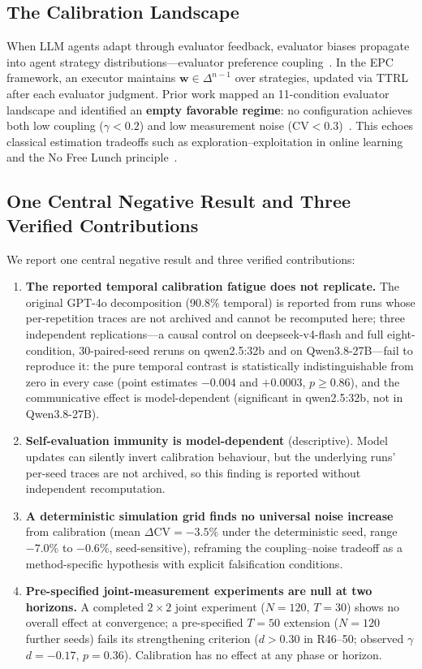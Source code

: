 \documentclass[11pt]{article}
\newcommand{\CV}{\ensuremath{\mathrm{CV}}}
\theoremstyle{definition}
\theoremstyle{remark}
\begin{document}
\subsection{The Calibration Landscape}

When LLM agents adapt through evaluator feedback, evaluator biases propagate into agent strategy distributions---evaluator preference coupling~\citep{epc2026}. In the EPC framework, an executor maintains $\mathbf{w} \in \Delta^{n-1}$ over strategies, updated via TTRL after each evaluator judgment. Prior work mapped an 11-condition evaluator landscape and identified an \textbf{empty favorable regime}: no configuration achieves both low coupling ($\gamma < 0.2$) and low measurement noise ($\CV < 0.3$)~\citep{caleffects2026}. This echoes classical estimation tradeoffs such as exploration--exploitation in online learning~\citep{bubeck2012regret} and the No Free Lunch principle~\citep{wolpert1997no}.

\subsection{One Central Negative Result and Three Verified Contributions}

We report one central negative result and three verified contributions:
\begin{enumerate}[leftmargin=*,nosep]
    \item \textbf{The reported temporal calibration fatigue does not replicate.} The original GPT-4o decomposition (90.8\% temporal) is reported from runs whose per-repetition traces are not archived and cannot be recomputed here; three independent replications---a causal control on deepseek-v4-flash and full eight-condition, 30-paired-seed reruns on qwen2.5:32b and on Qwen3.8-27B---fail to reproduce it: the pure temporal contrast is statistically indistinguishable from zero in every case (point estimates $-0.004$ and $+0.0003$, $p \geq 0.86$), and the communicative effect is model-dependent (significant in qwen2.5:32b, not in Qwen3.8-27B).
    \item \textbf{Self-evaluation immunity is model-dependent} (descriptive). Model updates can silently invert calibration behaviour, but the underlying runs' per-seed traces are not archived, so this finding is reported without independent recomputation.
    \item \textbf{A deterministic simulation grid finds no universal noise increase} from calibration (mean $\Delta\CV = -3.5\%$ under the deterministic seed, range $-7.0\%$ to $-0.6\%$, seed-sensitive), reframing the coupling--noise tradeoff as a method-specific hypothesis with explicit falsification conditions.
    \item \textbf{Pre-specified joint-measurement experiments are null at two horizons.} A completed $2 \times 2$ joint experiment ($N{=}120$, $T{=}30$) shows no overall effect at convergence; a pre-specified $T{=}50$ extension ($N{=}120$ further seeds) fails its strengthening criterion ($d > 0.30$ in R46--50; observed $\gamma$ $d{=}-0.17$, $p{=}0.36$). Calibration has no effect at any phase or horizon.
\end{enumerate}
\end{document}
